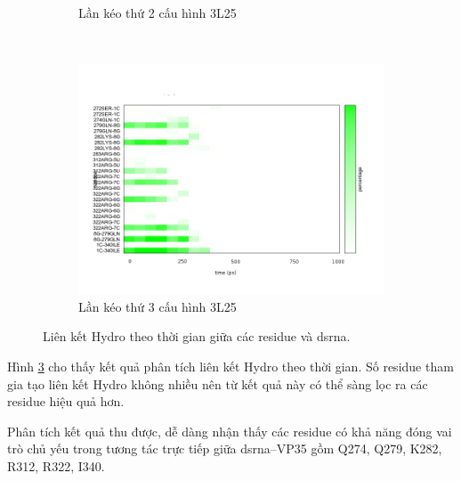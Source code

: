 \documentclass[12pt,a4paper,reqno, oneside]{book}
\begin{document}
\begin{figure}[h!]
\begin{subfigure}{0.7\textwidth}
\vspace{-40pt}
\caption{Lần kéo thứ 2 cấu hình 3L25}
\label{fig:hbond3L25_pull2}
\end{subfigure}\\
\begin{subfigure}{0.7\textwidth}
\vspace{-20pt}
\includegraphics[width=\textwidth,natwidth=610,natheight=642]{hbond3L25_pull3}
\vspace{-40pt}
\caption{Lần kéo thứ 3 cấu hình 3L25}
\label{fig:hbond3L25_pull3}
\end{subfigure}
\vspace{-20pt}
\caption{Liên kết Hydro theo thời gian giữa các \gls{residue} và \gls{dsrna}.}
\label{fig:hbond}
\end{figure}

Hình \ref{fig:hbond} cho thấy kết quả phân tích liên kết Hydro theo thời gian. Số \gls{residue} tham gia tạo liên kết Hydro không nhiều nên từ kết quả này có thể sàng lọc ra các \gls{residue} hiệu quả hơn.

Phân tích kết quả thu được, dễ dàng nhận thấy các \gls{residue} có khả năng đóng vai trò chủ yếu trong tương tác trực tiếp giữa \gls{dsrna}--VP35 gồm Q274, Q279, K282, R312, R322, I340.
\end{document}
